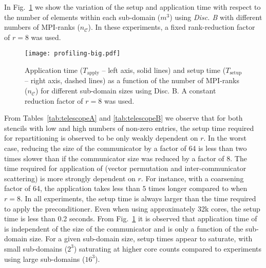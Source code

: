 \documentclass[]{siamart0216}
\begin{document}
In Fig.~\ref{fig:agglomprof} we show the variation of the setup and application time with respect to the  number of elements 
within each sub-domain ($m^3$) using \emph{Disc. B} with different numbers of MPI-ranks ($n_\mathcal{C}$).
In these experiments, a fixed rank-reduction factor of $r = 8$ was used. 
\begin{figure}[h!]
\centering
\texttt{[image: profiling-big.pdf]}
\caption{Application time ($T_\mathrm{apply}$ -- left axis, solid lines) and setup time ($T_\mathrm{setup}$ -- right axis, dashed lines) as a function of 
the number of MPI-ranks ($n_{\mathcal C}$) for different sub-domain sizes using Disc. B.
A constant reduction factor of $r=8$ was used. \label{fig:agglomprof}}
\end{figure}


From Tables~\ref{tab:telescopeA} and \ref{tab:telescopeB} we observe that for both stencils with low and high numbers of non-zero entries, 
the setup time required for repartitioning is observed to be only weakly dependent on $r$. 
In the worst case, reducing the size of the communicator by a factor of 64 is less than two times slower than if the communicator size was reduced by a factor of 8.
The time required for application of  (vector permutation and inter-communicator scattering) is more strongly dependent on $r$. For instance, with a coarsening factor of 64, the application takes less than $5$ times longer compared to when $r=8$.
In all experiments, the setup time is always larger than the time required to apply the preconditioner.
Even when using approximately 32k cores, the setup time is less than 0.2 seconds.
From Fig.~\ref{fig:agglomprof} it is observed that application time of  is independent of the size of the communicator and is only a function of the sub-domain size.
For a given sub-domain size, setup times appear to saturate, 
with small sub-domains ($2^3$) saturating at higher core counts compared to experiments using large sub-domains ($16^3$).
\end{document}
